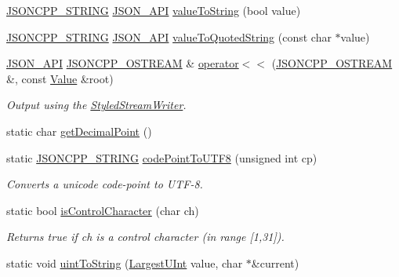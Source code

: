 \begin{DoxyCompactItemize}
\item 
\hyperlink{json_8h_a1e723f95759de062585bc4a8fd3fa4be}{J\+S\+O\+N\+C\+P\+P\+\_\+\+S\+T\+R\+I\+NG} \hyperlink{json_8h_a1d61ffde86ce1a18fd83194ff0d9a206}{J\+S\+O\+N\+\_\+\+A\+PI} \hyperlink{namespace_json_a0a706a1fffba4fe8a8c1ef75b2dbbfab}{value\+To\+String} (bool value)
\item 
\hyperlink{json_8h_a1e723f95759de062585bc4a8fd3fa4be}{J\+S\+O\+N\+C\+P\+P\+\_\+\+S\+T\+R\+I\+NG} \hyperlink{json_8h_a1d61ffde86ce1a18fd83194ff0d9a206}{J\+S\+O\+N\+\_\+\+A\+PI} \hyperlink{namespace_json_aaf777a6923bcb4cf63a2729973fe5315}{value\+To\+Quoted\+String} (const char $\ast$value)
\item 
\hyperlink{json_8h_a1d61ffde86ce1a18fd83194ff0d9a206}{J\+S\+O\+N\+\_\+\+A\+PI} \hyperlink{json_8h_a37a25be5fca174927780caeb280094ce}{J\+S\+O\+N\+C\+P\+P\+\_\+\+O\+S\+T\+R\+E\+AM} \& \hyperlink{namespace_json_a975d1dbca8aa7a06f38d373edcb9081c}{operator$<$$<$} (\hyperlink{json_8h_a37a25be5fca174927780caeb280094ce}{J\+S\+O\+N\+C\+P\+P\+\_\+\+O\+S\+T\+R\+E\+AM} \&, const \hyperlink{class_json_1_1_value}{Value} \&root)
\begin{DoxyCompactList}\small\item\em Output using the \hyperlink{class_json_1_1_styled_stream_writer}{Styled\+Stream\+Writer}. \end{DoxyCompactList}\item 
static char \hyperlink{namespace_json_ac99d7a5551039dfa712dd1d143c25a16}{get\+Decimal\+Point} ()
\item 
static \hyperlink{json_8h_a1e723f95759de062585bc4a8fd3fa4be}{J\+S\+O\+N\+C\+P\+P\+\_\+\+S\+T\+R\+I\+NG} \hyperlink{namespace_json_a33f8bda65a5b1fc4f5ddc39cb03dc742}{code\+Point\+To\+U\+T\+F8} (unsigned int cp)
\begin{DoxyCompactList}\small\item\em Converts a unicode code-\/point to U\+T\+F-\/8. \end{DoxyCompactList}\item 
static bool \hyperlink{namespace_json_a0381e631737f51331065a388f4f59197}{is\+Control\+Character} (char ch)
\begin{DoxyCompactList}\small\item\em Returns true if ch is a control character (in range \mbox{[}1,31\mbox{]}). \end{DoxyCompactList}\item 
static void \hyperlink{namespace_json_ac1ffd21a9e55122014353c773ccc496e}{uint\+To\+String} (\hyperlink{namespace_json_ae202ecad69725e23443f465e257456d0}{Largest\+U\+Int} value, char $\ast$\&current)

\end{DoxyCompactItemize}
